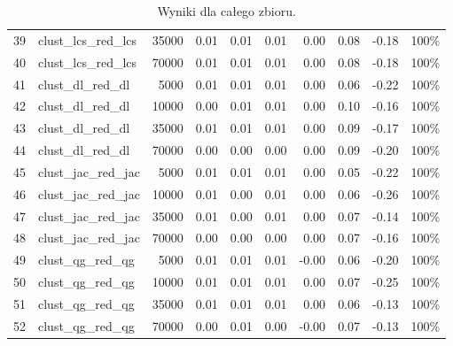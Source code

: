 \documentclass{praca1}
\begin{document}
\begin{table}[!h]
\begin{tabular}{|rlr|rrr|rr|r|r|}
  39 & clust\_lcs\_red\_lcs & 35000 & 0.01 & 0.01 & 0.01 & 0.00 & 0.08 & -0.18 & 100\% \\ 
  40 & clust\_lcs\_red\_lcs & 70000 & 0.01 & 0.01 & 0.01 & 0.00 & 0.08 & -0.18 & 100\% \\ 
   \hline
41 & clust\_dl\_red\_dl & 5000 & 0.01 & 0.01 & 0.01 & 0.00 & 0.06 & -0.22 & 100\% \\ 
  42 & clust\_dl\_red\_dl & 10000 & 0.00 & 0.01 & 0.01 & 0.00 & 0.10 & -0.16 & 100\% \\ 
  43 & clust\_dl\_red\_dl & 35000 & 0.01 & 0.01 & 0.01 & 0.00 & 0.09 & -0.17 & 100\% \\ 
  44 & clust\_dl\_red\_dl & 70000 & 0.00 & 0.00 & 0.00 & 0.00 & 0.09 & -0.20 & 100\% \\ 
   \hline
45 & clust\_jac\_red\_jac & 5000 & 0.01 & 0.01 & 0.01 & 0.00 & 0.05 & -0.22 & 100\% \\ 
  46 & clust\_jac\_red\_jac & 10000 & 0.01 & 0.00 & 0.01 & 0.00 & 0.06 & -0.26 & 100\% \\ 
  47 & clust\_jac\_red\_jac & 35000 & 0.01 & 0.00 & 0.01 & 0.00 & 0.07 & -0.14 & 100\% \\ 
  48 & clust\_jac\_red\_jac & 70000 & 0.00 & 0.00 & 0.00 & 0.00 & 0.07 & -0.16 & 100\% \\ 
   \hline
49 & clust\_qg\_red\_qg & 5000 & 0.01 & 0.01 & 0.01 & -0.00 & 0.06 & -0.20 & 100\% \\ 
  50 & clust\_qg\_red\_qg & 10000 & 0.01 & 0.01 & 0.01 & 0.00 & 0.07 & -0.25 & 100\% \\ 
  51 & clust\_qg\_red\_qg & 35000 & 0.01 & 0.01 & 0.01 & 0.00 & 0.06 & -0.13 & 100\% \\ 
  52 & clust\_qg\_red\_qg & 70000 & 0.00 & 0.01 & 0.00 & -0.00 & 0.07 & -0.13 & 100\% \\ 
   \hline
\end{tabular}
\caption{Wyniki dla całego zbioru.}
\label{tab:006}
\end{table}
\end{document}
